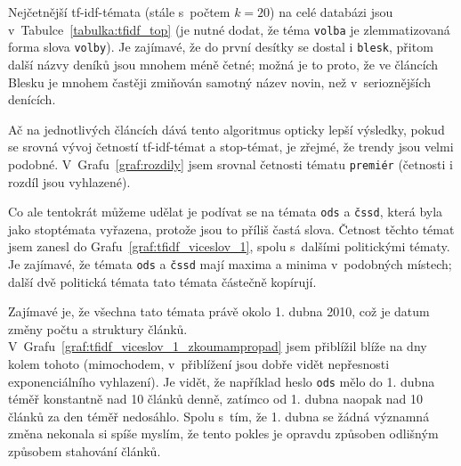 \documentclass[12pt,a4paper]{report}
\begin{document}

Nejčetnější tf-idf-témata (stále s~počtem $k=20$) na celé databázi jsou v~Tabulce~\ref{tabulka:tfidf_top} (je nutné dodat, že téma \texttt{volba} je zlemmatizovaná forma slova \texttt{volby}). Je zajímavé, že do první desítky se dostal i \texttt{blesk}, přitom další názvy deníků jsou mnohem méně četné; možná je to proto, že ve článcích Blesku je mnohem častěji zmiňován samotný název novin, než v~serioznějších denících.



Ač na jednotlivých článcích dává tento algoritmus opticky lepší výsledky, pokud se srovná vývoj četností tf-idf-témat a stop-témat, je zřejmé, že trendy jsou velmi podobné. V~Grafu~\ref{graf:rozdily} jsem srovnal četnosti tématu \texttt{premiér} (četnosti i rozdíl jsou vyhlazené). 





Co ale tentokrát můžeme udělat je podívat se  na témata \texttt{ods} a \texttt{čssd}, která byla jako stoptémata vyřazena, protože jsou to příliš častá slova. Četnost těchto témat jsem zanesl do Grafu~\ref{graf:tfidf_viceslov_1}, spolu s~dalšími politickými tématy. Je zajímavé, že témata \texttt{ods} a \texttt{čssd} mají maxima a minima v~podobných místech; další dvě politická témata tato témata částečně kopírují. 

Zajímavé je, že všechna tato témata  právě okolo 1. dubna 2010, což je datum změny počtu a struktury článků. V~Grafu~\ref{graf:tfidf_viceslov_1_zkoumampropad} jsem přiblížil blíže na dny kolem tohoto  (mimochodem, v~přiblížení jsou dobře vidět nepřesnosti exponenciálního vyhlazení). Je vidět, že například heslo \texttt{ods} mělo do 1. dubna téměř konstantně nad 10 článků denně, zatímco od 1. dubna naopak nad 10 článků za den téměř nedosáhlo. Spolu s~tím, že 1. dubna se žádná významná změna nekonala si spíše myslím, že tento pokles je opravdu způsoben odlišným způsobem stahování článků.
\end{document}

